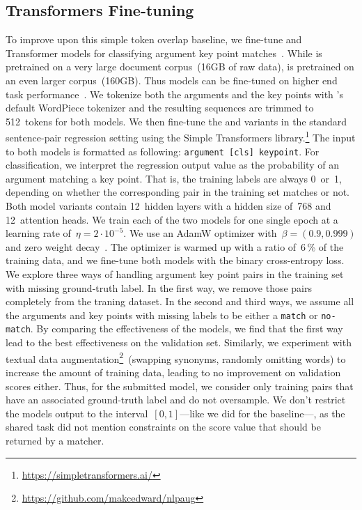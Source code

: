 \subsection{Transformers Fine-tuning}

To improve upon this simple token overlap baseline, we fine-tune \Bert and \Roberta Transformer models for classifying 
argument key point matches~\cite{DevlinCLT2019,LiuOGDJCLLZS2019}.
While \Bert is pretrained on a very large document corpus~(16GB of raw data), \Roberta is pretrained on an even larger corpus~(160GB).
Thus \Roberta models can be fine-tuned on higher end task performance~\cite{LiuOGDJCLLZS2019}.
We tokenize both the arguments and the key points with \Bert's default WordPiece tokenizer and the resulting sequences 
are trimmed to 512~tokens for both models.
We then fine-tune the \BertBase and \RobertaBase variants in the standard sentence-pair regression setting using 
the Simple Transformers library.\footnote{\url{https://simpletransformers.ai/}}
The input to both models is formatted as following:  \texttt{argument [cls] keypoint}.
For classification, we interpret the regression output value as the probability of an argument matching a key point.
That is, the training labels are always 0~or~1, depending on whether the corresponding pair in the training set matches or not.
Both model variants contain 12~hidden layers with a hidden size of~768 and 12~attention heads.
We train each of the two models for one single epoch at a learning rate of~\( \eta = 2 \cdot 10^{-5} \).
We use an AdamW optimizer with~\( \beta = (0.9, 0.999) \) and zero weight decay~\cite{LoshchilovH2019}.
The optimizer is warmed up with a ratio of~6\,\% of the training data, and we fine-tune both models with the binary cross-entropy loss.
We explore three ways of handling argument key point pairs in the training set with missing ground-truth label. In the first way, we remove those pairs completely from the traning dataset. In the second and third ways, we assume all the arguments and key points with missing labels to be either a \texttt{match} or \texttt{no-match}. By comparing the effectiveness of the models, we find that the first way lead to the best effectiveness on the validation set.
Similarly, we experiment with textual data augmentation\footnote{\url{https://github.com/makcedward/nlpaug}}~(swapping synonyms, 
randomly omitting words) to increase the amount of training data, leading to no improvement on validation scores either.
Thus, for the submitted model, we consider only training pairs that have an associated ground-truth label and do not oversample.
We don't restrict the models output to the interval~\([0,1]\)---like we did for the baseline---, as the shared task did not 
mention constraints on the score value that should be returned by a matcher.
